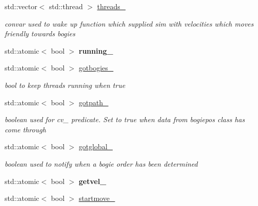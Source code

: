 \begin{DoxyCompactItemize}
std\+::vector$<$ std\+::thread $>$ \hyperlink{classControl_afe4abd7bbf2c1a1d21ffa037ddf8ee82}{threads\+\_\+}
\begin{DoxyCompactList}\small\item\em convar used to wake up function which supplied sim with velocities which moves friendly towards bogies \end{DoxyCompactList}\item 
\mbox{\label{classControl_a2183b81bba807e732f8cd768e99c6e20}} 
std\+::atomic$<$ bool $>$ {\bfseries running\+\_\+}
\item 
\mbox{\label{classControl_a77748ccf7bb58ffa0b280ad7e33a2f9e}} 
std\+::atomic$<$ bool $>$ \hyperlink{classControl_a77748ccf7bb58ffa0b280ad7e33a2f9e}{gotbogies\+\_\+}
\begin{DoxyCompactList}\small\item\em bool to keep threads running when true \end{DoxyCompactList}\item 
\mbox{\label{classControl_adf8a05b46c15032b9d7cc72f9b2b5d6e}} 
std\+::atomic$<$ bool $>$ \hyperlink{classControl_adf8a05b46c15032b9d7cc72f9b2b5d6e}{gotpath\+\_\+}
\begin{DoxyCompactList}\small\item\em boolean used for cv\+\_\+ predicate. Set to true when data from bogiepos class has come through \end{DoxyCompactList}\item 
\mbox{\label{classControl_afde9de0840660562bfb1d4adaf513a58}} 
std\+::atomic$<$ bool $>$ \hyperlink{classControl_afde9de0840660562bfb1d4adaf513a58}{gotglobal\+\_\+}
\begin{DoxyCompactList}\small\item\em boolean used to notify when a bogie order has been determined \end{DoxyCompactList}\item 
\mbox{\label{classControl_ac976ca5679155e87d0d48439515385f6}} 
std\+::atomic$<$ bool $>$ {\bfseries getvel\+\_\+}
\item 
\mbox{\label{classControl_a7eda266577684041424f5f30b83e7c61}} 
std\+::atomic$<$ bool $>$ \hyperlink{classControl_a7eda266577684041424f5f30b83e7c61}{startmove\+\_\+}

\end{DoxyCompactItemize}
